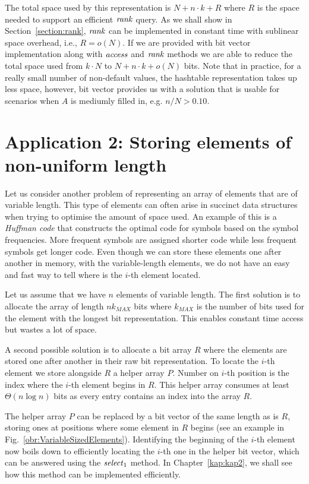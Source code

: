 The total space used by this representation is $N+n\cdot k+R$ where $R$ is the space needed
to support an efficient $\mathit{rank}$ query. As we shall show in Section~\ref{section:rank}, $\mathit{rank}$
can be implemented in constant time with sublinear space overhead, i.e., $R = o(N)$. If we are
provided with bit vector implementation along with $\mathit{access}$ and $\mathit{rank}$ methods we are able to
reduce the total space used from $k\cdot N$ to $N+n\cdot k+o(N)$ bits. Note that in practice,
for a really small number of non-default values, the hashtable representation takes up less
space, however, bit vector provides us with a solution that is usable for scenarios when $A$
is mediumly filled in, e.g. $n/N>0.10$.

\section{Application 2: Storing elements of non-uniform length}

Let us consider another problem of representing an array of elements that are of variable length.
This type of elements can often arise in succinct data structures when trying to
optimise the amount of space used. An example of this is a \textit{Huffman code} \citep{huffman1952method}
that constructs the optimal code for symbols based on the symbol frequencies. More frequent
symbols are assigned shorter code while less frequent symbols get longer code.
Even though we can store these elements one after another in memory, with the variable-length
elements, we do not have an easy and fast way to tell where is the $i$-th element located.

Let us assume that we have $n$ elements of variable length. The first solution is to allocate
the array of length $nk_{MAX}$ bits where $k_{MAX}$ is the number of bits used for the element
with the longest bit representation. This enables constant time access but wastes a lot of space.

A second possible solution is to allocate a bit array $R$ where the elements are stored one after
another in their raw bit representation. To locate the $i$-th element we store alongside $R$ a
helper array $P$. Number on $i$-th position is the index where the $i$-th element begins in $R$.
This helper array consumes at least $\Theta(n\log n)$ bits as every entry contains an index into
the array $R$.

The helper array $P$ can be replaced by a bit vector of the same length as is $R$, storing ones at
positions where some element in $R$ begins (see an example in Fig.~\ref{obr:VariableSizedElements}).
Identifying the beginning of the $i$-th element now boils down to efficiently locating the
$i$-th one in the helper bit vector, which can be answered using the $\mathit{select}_1$ method.
In Chapter~\ref{kap:kap2}, we shall see how this method can be implemented efficiently.

